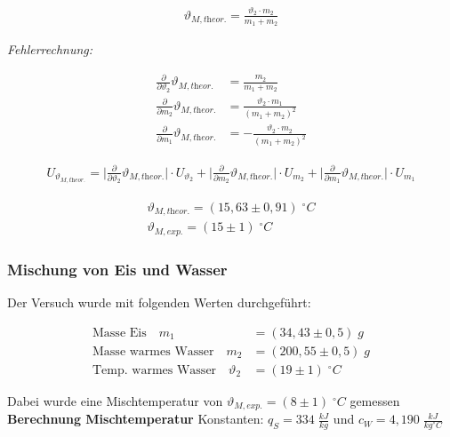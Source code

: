\documentclass[a4paper]{scrartcl}
\numberwithin{equation}{subsection}
\begin{document}
\begin{align}
\vartheta_{M, \textit{theor.}} = \frac{\vartheta_2 \cdot m_2}{m_1 + m_2}
\end{align}

\textit{Fehlerrechnung:}

\begin{align*}
\frac{\partial}{\partial \vartheta_2} \vartheta_{M, \textit{theor.}} &= \frac{m_2}{m_1 + m_2} \\
\frac{\partial}{\partial m_2} \vartheta_{M, \textit{theor.}} &= \frac{\vartheta_2 \cdot m_1}{(m_1 + m_2)^2} \\
\frac{\partial}{\partial m_1} \vartheta_{M, \textit{theor.}} &= - \frac{\vartheta_2 \cdot m_2}{(m_1 + m_2)^2}
\end{align*}

\begin{align*}
U_{\vartheta_{M, \textit{theor.}}} = \bigg | \frac{\partial}{\partial \vartheta_2} \vartheta_{M, \textit{theor.}} \bigg | \cdot U_{\vartheta_2} + 
									\bigg | \frac{\partial}{\partial m_2} \vartheta_{M, \textit{theor.}} \bigg | \cdot U_{m_2} +
									\bigg | \frac{\partial}{\partial m_1} \vartheta_{M, \textit{theor.}} \bigg | \cdot U_{m_1}
\end{align*}

\begin{align*}
\vartheta_{M, \textit{theor.}} = (15,63\pm0,91)\; ^\circ C \\
\vartheta_{M, \textit{exp.}} = (15\pm1)\; ^\circ C
\end{align*}

\subsubsection{Mischung von Eis und Wasser}

Der Versuch wurde mit folgenden Werten durchgeführt:

\begin{align*}
\text{Masse Eis} \quad m_1 &= (34,43\pm0,5)\;g \\
\text{Masse warmes Wasser} \quad m_2 &= (200,55\pm0,5)\;g\\
\text{Temp. warmes Wasser} \quad \vartheta_2 &= (19\pm1)\; ^\circ C
\end{align*}

Dabei wurde eine Mischtemperatur von $\vartheta_{M, \textit{exp.}} = (8\pm1)\; ^\circ C$ gemessen \\

\textbf{Berechnung Mischtemperatur}
Konstanten: $q_S = 334\;\frac{kJ}{kg}$ und $c_W = 4,190\;\frac{kJ}{kg ^\circ C}$ \\
\end{document}

